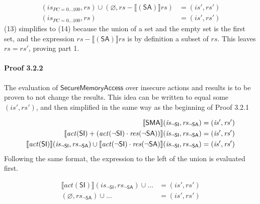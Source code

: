 \documentclass[12pt, letterpaper]{article}
\let\emptyset\varnothing
\newcommand\interp[1]{\llbracket #1 \rrbracket}
\begin{document}
 \par\nobreak
 {\fontsize{10pt}{12pt}\selectfont
 \begin{align}
     (\mathit{is_{PC=0\ldots100}}, \mathit{rs}) \cup 
     (\emptyset, \mathit{rs} - \interp{ (\mathsf{SA}) } \mathit{rs})
     &=
     (\mathit{is}', \mathit{rs}')
     \\
     (\mathit{is_{PC=0\ldots100}}, \mathit{rs})
     &=
     (\mathit{is}', \mathit{rs}')
 \end{align}
 }%
     (13) simplifies to (14) because the union of a set and the empty set is the first set, and the expression $\mathit{rs} - \interp{ (\mathsf{SA}) } \mathit{rs}$ is by definition a subset of $\mathit{rs}$.  This leaves $\mathit{rs} = \mathit{rs}'$, proving part 1. 

 \paragraph{Proof 3.2.2}
     The evaluation of $\mathsf{SecureMemoryAccess}$ over insecure actions and results is to be proven to not change the results.  This idea can be written to equal some $(\mathit{is}', \mathit{rs}')$, and then simplified in the same way as the beginning of Proof 3.2.1
 \par\nobreak
 {\fontsize{10pt}{12pt}\selectfont
 \begin{align}
     \setcounter{equation}{0}
     \interp{ \mathsf{SMA} } (\mathit{is_{\mathsf{\neg SI}}}, \mathit{rs_{\mathsf{\neg SA}}})
     &=
     (\mathit{is}', \mathit{rs}')
     \\
     \interp{ \mathit{act}(\mathsf{SI}) +
     (\mathit{act}(\neg\mathsf{SI}) \cdot
      \mathit{res}(\neg\mathsf{SA}))  } (\mathit{is_{\mathsf{\neg SI}}}, \mathit{rs_{\mathsf{\neg SA}}})
     &=
     (\mathit{is}', \mathit{rs}')
     \\
     \interp{ \mathit{act}(\mathsf{SI}) } (\mathit{is_{\mathsf{\neg SI}}}, \mathit{rs_{\mathsf{\neg SA}}}) \cup %
     \interp{ \mathit{act}(\neg\mathsf{SI}) \cdot
      \mathit{res}(\neg\mathsf{SA}) } (\mathit{is_{\mathsf{\neg SI}}}, \mathit{rs_{\mathsf{\neg SA}}})
     &=
     (\mathit{is}', \mathit{rs}')
 \end{align}
 }%
     Following the same format, the expression to the left of the union is evaluated first.
 \par\nobreak
 {\fontsize{10pt}{12pt}\selectfont
 \begin{align}
     \interp{ \mathit{act}(\mathsf{SI}) } (\mathit{is_{\mathsf{\neg SI}}}, \mathit{rs_{\mathsf{\neg SA}}}) \cup \ldots
     &=
     (\mathit{is}', \mathit{rs}')
     \\
     (\emptyset, \mathit{rs_{\mathsf{\neg SA}}}) \cup \ldots
     &=
     (\mathit{is}', \mathit{rs}')
 \end{align}
 }%
\end{document}
